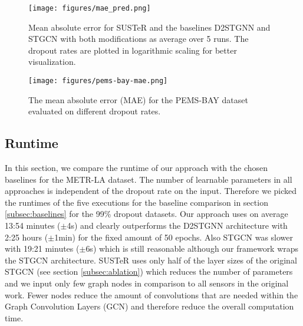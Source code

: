 \begin{figure}[ht]
    \centering
    \texttt{[image: figures/mae\_pred.png]}
    \caption{Mean absolute error for SUSTeR and the baselines D2STGNN and STGCN with both modifications as average over 5 runs. The dropout rates are plotted in logarithmic scaling for better visualization.}
    \label{fig:performance_mae}
\end{figure}



\begin{figure}[ht]
    \centering
    \texttt{[image: figures/pems-bay-mae.png]}
    \caption{The mean absolute error (MAE) for the PEMS-BAY dataset evaluated on different dropout rates.}
    \label{fig:performance_mae_bay}
\end{figure}



\subsection{Runtime}
\label{subsec:runtime}
In this section, we compare the runtime of our approach with the chosen baselines for the METR-LA dataset.
The number of learnable parameters in all approaches is independent of the dropout rate on the input.
Therefore we picked the runtimes of the five executions for the baseline comparison in section \ref{subsec:baselines} for the 99\% dropout datasets.
Our approach uses on average 13:54 minutes ($\pm$4s) and clearly outperforms the D2STGNN architecture with 2:25 hours ($\pm$1min) for the fixed amount of 50 epochs.
Also STGCN was slower with 19:21 minutes ($\pm$6s) which is still reasonable although our framework wraps the STGCN architecture.
SUSTeR uses only half of the layer sizes of the original STGCN (see section \ref{subsec:ablation}) which reduces the number of parameters and we input only few graph nodes in comparison to all sensors in the original work.
Fewer nodes reduce the amount of convolutions that are needed within the Graph Convolution Layers (GCN) and therefore reduce the overall computation time.


